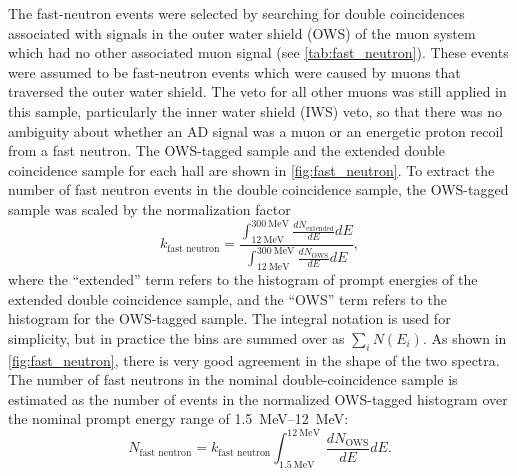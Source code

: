 The fast-neutron events were selected by searching for
double coincidences associated with signals
in the outer water shield (OWS) of the muon system
which had no other associated muon signal
(see \cref{tab:fast_neutron}).
These events were assumed to be fast-neutron events
which were caused by muons that traversed the outer water shield.
The veto for all other muons was still applied in this sample,
particularly the inner water shield (IWS) veto,
so that there was no ambiguity about whether an AD signal
was a muon or an energetic proton recoil from a fast neutron.
The OWS-tagged sample and the extended double coincidence sample for each hall
are shown in \cref{fig:fast_neutron}.
To extract the number of fast neutron events in the double coincidence sample,
the OWS-tagged sample was scaled by the normalization factor
\begin{equation}\label{eq:fast_neutron_integral}
    k_\text{fast neutron} = \frac{
        \int_{\SI{12}{\MeV}}^{\SI{300}{\MeV}} \frac{dN_{\text{extended}}}{dE} dE
    }{
        \int_{\SI{12}{\MeV}}^{\SI{300}{\MeV}} \frac{dN_{\text{OWS}}}{dE} dE
    },
\end{equation}
where the ``extended'' term refers to the histogram of prompt energies
of the extended double coincidence sample,
and the ``OWS'' term refers to the histogram for the OWS-tagged sample.
The integral notation is used for simplicity,
but in practice the bins are summed over as $\sum_i N(E_i)$.
As shown in \cref{fig:fast_neutron},
there is very good agreement in the shape of the two spectra.
The number of fast neutrons in the nominal double-coincidence sample
is estimated as the number of events in the normalized OWS-tagged histogram
over the nominal prompt energy range of \SIrange{1.5}{12}{\MeV}:
\begin{equation}\label{eq:fast_neutron_count}
    N_\text{fast neutron} = k_\text{fast neutron}
    \int_{\SI{1.5}{\MeV}}^{\SI{12}{\MeV}} \frac{dN_{\text{OWS}}}{dE} dE.
\end{equation}

